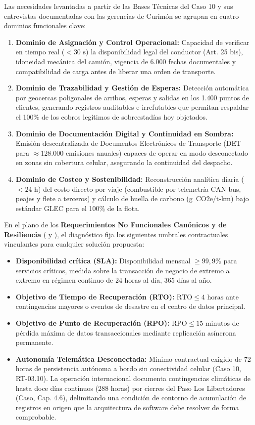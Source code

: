 Las necesidades levantadas a partir de las Bases Técnicas del Caso 10 y sus entrevistas documentadas con las gerencias de Curimón se agrupan en cuatro dominios funcionales clave:
\begin{enumerate}
  \item \textbf{Dominio de Asignación y Control Operacional:} Capacidad de verificar en tiempo real ($< 30\text{ s}$) la disponibilidad legal del conductor (Art. 25 bis), idoneidad mecánica del camión, vigencia de 6.000 fechas documentales y compatibilidad de carga antes de liberar una orden de transporte.
  \item \textbf{Dominio de Trazabilidad y Gestión de Esperas:} Detección automática por geocercas poligonales de arribos, esperas y salidas en los 1.400 puntos de clientes, generando registros auditables e irrefutables que permitan respaldar el 100\% de los cobros legítimos de sobreestadías hoy objetados.
  \item \textbf{Dominio de Documentación Digital y Continuidad en Sombra:} Emisión descentralizada de Documentos Electrónicos de Transporte (DET para $\approx 128.000$ emisiones anuales) capaces de operar en modo desconectado en zonas sin cobertura celular, asegurando la continuidad del despacho.
  \item \textbf{Dominio de Costeo y Sostenibilidad:} Reconstrucción analítica diaria ($< 24\text{ h}$) del costo directo por viaje (combustible por telemetría CAN bus, peajes y flete a terceros) y cálculo de huella de carbono (g~CO2e/t-km) bajo estándar GLEC para el 100\% de la flota.
\end{enumerate}

En el plano de los \textbf{Requerimientos No Funcionales Canónicos y de Resiliencia} ( y ), el diagnóstico fija los siguientes umbrales contractuales vinculantes para cualquier solución propuesta:
\begin{itemize}
  \item \textbf{Disponibilidad crítica (SLA):} Disponibilidad mensual $\ge 99{,}9\%$ para servicios críticos, medida sobre la transacción de negocio de extremo a extremo en régimen continuo de 24 horas al día, 365 días al año.
  \item \textbf{Objetivo de Tiempo de Recuperación (RTO):} $\text{RTO} \le 4\text{ horas}$ ante contingencias mayores o eventos de desastre en el centro de datos principal.
  \item \textbf{Objetivo de Punto de Recuperación (RPO):} $\text{RPO} \le 15\text{ minutos}$ de pérdida máxima de datos transaccionales mediante replicación asíncrona permanente.
  \item \textbf{Autonomía Telemática Desconectada:} Mínimo contractual exigido de 72 horas de persistencia autónoma a bordo sin conectividad celular (Caso 10, RT-03.10). La operación internacional documenta contingencias climáticas de hasta doce días continuos (288 horas) por cierres del Paso Los Libertadores (Caso, Cap. 4.6), delimitando una condición de contorno de acumulación de registros en origen que la arquitectura de software debe resolver de forma comprobable.
\end{itemize}

